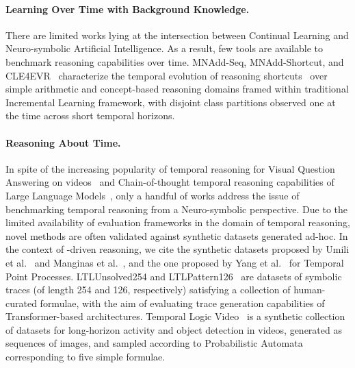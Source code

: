 \paragraph{Learning Over Time with Background Knowledge.} There are limited works lying at the intersection between Continual Learning and Neuro-symbolic Artificial Intelligence. As a result, few tools are available to benchmark reasoning capabilities over time.
MNAdd-Seq, MNAdd-Shortcut, and CLE4EVR~\cite{marconato2023neuro} characterize the temporal evolution of reasoning shortcuts~\cite{marconato2023not} over simple arithmetic and concept-based reasoning domains framed within traditional Incremental Learning framework, with disjoint class partitions observed one at the time across short temporal horizons.

\paragraph{Reasoning About Time.}
In spite of the increasing popularity of temporal reasoning for Visual Question Answering on videos~\cite{sun2021video} and Chain-of-thought temporal reasoning capabilities of Large Language Models~\cite{xiong2024large,ji2025chain,chu2023timebench}, only a handful of works address the issue of benchmarking temporal reasoning from a Neuro-symbolic perspective.
Due to the limited availability of evaluation frameworks in the domain of temporal reasoning, novel methods are often validated against synthetic datasets generated ad-hoc. In the context of \LTLf-driven reasoning, we cite the synthetic datasets proposed by Umili et al.~\cite{umili2023grounding,umili2024deepdfa} and Manginas et al.~\cite{manginas2024nesya}, and the one proposed by Yang et al.~\cite{yang2024neuro} for Temporal Point Processes.
LTLUnsolved254 and LTLPattern126~\cite{hahn2020teaching} are datasets of symbolic traces (of length 254 and 126, respectively) satisfying a collection of human-curated \LTL formulae, with the aim of evaluating trace generation capabilities of Transformer-based architectures.
Temporal Logic Video~\cite{choi2024towards} is a synthetic collection of datasets for long-horizon activity and object detection in videos, generated as sequences of images, and sampled according to Probabilistic Automata corresponding to five simple \LTL formulae. 
%
